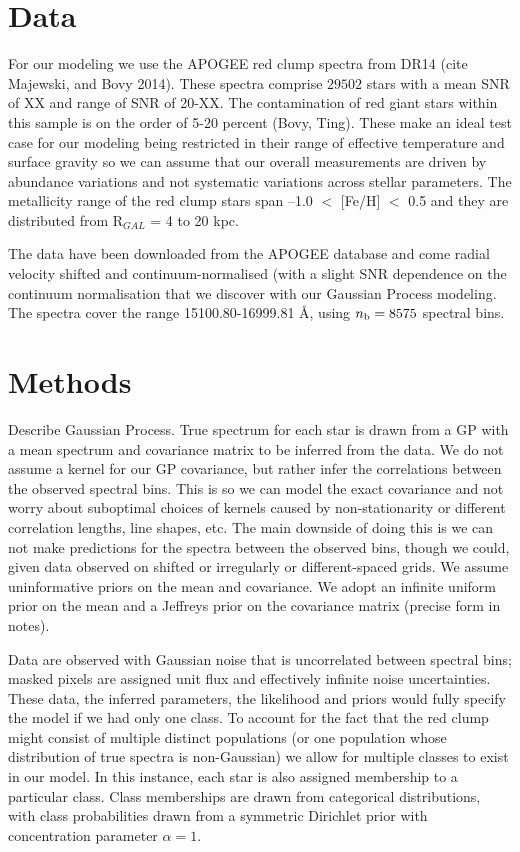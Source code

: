 \documentclass[a4paper,fleqn,usenatbib]{mnras}
\newcommand{\nb}{n_{\rm b}}
\begin{document}
\section{Data} 

For our modeling we use the APOGEE red clump spectra from DR14 (cite Majewski, and Bovy 2014). These spectra comprise $29502$ stars with a mean SNR of XX and range of SNR of 20-XX.  The contamination of red giant stars within this sample is on the order of 5-20 percent (Bovy, Ting).  These make an ideal test case for our modeling being restricted in their range of effective temperature and surface gravity so we can assume that our overall measurements are driven by abundance variations and not systematic variations across stellar parameters. The metallicity range of the red clump stars span --1.0 $<$ [Fe/H] $<$ 0.5 and they are distributed from R$_{GAL}$ = 4 to 20 kpc. 


The data have been downloaded from the APOGEE database and come radial velocity shifted and continuum-normalised (with a slight SNR dependence on the continuum normalisation that we discover with our Gaussian Process modeling. The spectra cover the range 15100.80-16999.81 \AA, using $\nb = 8575$ spectral bins. 

\section{Methods}

Describe Gaussian Process. True spectrum for each star is drawn from a GP with a mean spectrum and covariance matrix to be inferred from the data. We do not assume a kernel for our GP covariance, but rather infer the correlations between the observed spectral bins. This is so we can model the exact covariance and not worry about suboptimal choices of kernels caused by non-stationarity or different correlation lengths, line shapes, etc. The main downside of doing this is we can not make predictions for the spectra between the observed bins, though we could, given data observed on shifted or irregularly or different-spaced grids. We assume uninformative priors on the mean and covariance. We adopt an infinite uniform prior on the mean and a Jeffreys prior on the covariance matrix (precise form in notes).

Data are observed with Gaussian noise that is uncorrelated between spectral bins; masked pixels are assigned unit flux and effectively infinite noise uncertainties. These data, the inferred parameters, the likelihood and priors would fully specify the model if we had only one class. To account for the fact that the red clump might consist of multiple distinct populations (or one population whose distribution of true spectra is non-Gaussian) we allow for multiple classes to exist in our model. In this instance, each star is also assigned membership to a particular class. Class memberships are drawn from categorical distributions, with class probabilities drawn from a symmetric Dirichlet prior with concentration parameter $\alpha=1$.
\end{document}
